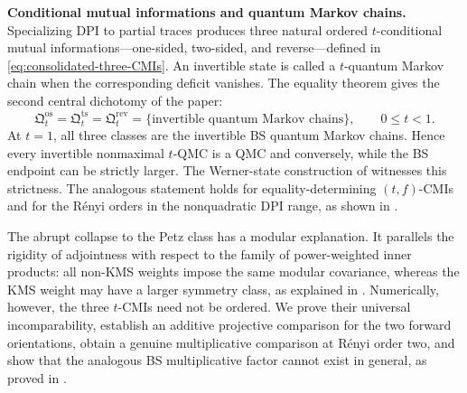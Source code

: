 \documentclass[11pt]{article}
\theoremstyle{remark}
\DeclareMathOperator{\os}{os}
\DeclareMathOperator{\ts}{ts}
\DeclareMathOperator{\rev}{rev}
\newcommand{\1}{\mathbbm{1}}
\begin{document}
\medskip
\noindent\textbf{Conditional mutual informations and quantum Markov
chains.}
Specializing DPI to partial traces produces three natural ordered
$t$-conditional mutual informations---one-sided, two-sided, and
reverse---defined in \eqref{eq:consolidated-three-CMIs}.  An invertible
state is called a $t$-quantum Markov chain when the corresponding
deficit vanishes.  The equality theorem gives the second central
dichotomy of the paper:
\begin{equation}
 \boxed{
 \mathfrak Q_t^{\os}=\mathfrak Q_t^{\ts}=\mathfrak Q_t^{\rev}
 =\{\text{invertible quantum Markov chains}\},
 \qquad 0\leq t<1.}
 \label{rw:eq:intro-tQMC-collapse}
\end{equation}
At $t=1$, all three classes are the invertible BS quantum Markov
chains.  Hence every invertible nonmaximal $t$-QMC is a QMC and
conversely, while the BS endpoint can be strictly larger.  The
Werner-state construction of \cite{Bluhm:2025kai} witnesses this
strictness.  The analogous statement holds for equality-determining
$(t,f)$-CMIs and for the R\'enyi orders in the nonquadratic DPI range,
as shown in
.

The abrupt collapse to the Petz class has a modular explanation.  It
parallels the rigidity of adjointness with respect to the family of
power-weighted inner products: all non-KMS weights impose the same
modular covariance, whereas the KMS weight may have a larger symmetry
class, as explained in
.  Numerically, however,
the three $t$-CMIs need not be ordered.  We prove their universal
incomparability, establish an additive projective comparison for the
two forward orientations, obtain a genuine multiplicative comparison
at R\'enyi order two, and show that the analogous BS multiplicative
factor cannot exist in general, as proved in
.
\end{document}

